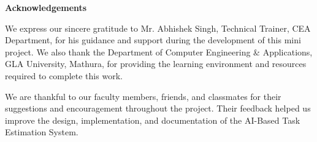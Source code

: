 \newpage
\thispagestyle{plain}
\begin{center}
    \vspace*{0.1cm}
    \Large
    \textbf{Acknowledgements}\\
    \vspace{0.5cm}
\end{center}

\begin{justify}
We express our sincere gratitude to Mr. Abhishek Singh, Technical Trainer, CEA Department, for his guidance and support during the development of this mini project. We also thank the Department of Computer Engineering \& Applications, GLA University, Mathura, for providing the learning environment and resources required to complete this work.

We are thankful to our faculty members, friends, and classmates for their suggestions and encouragement throughout the project. Their feedback helped us improve the design, implementation, and documentation of the AI-Based Task Estimation System.
\end{justify}
